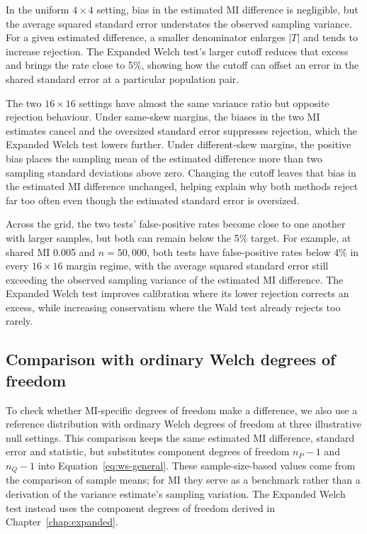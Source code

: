 \begin{table}[H]
\centering
\caption{Estimation errors and false-positive rates at three illustrative null settings.}
\label{tab:balanced-null-diagnostics}
\thesistableformat

\end{table}

In the uniform \(4\times4\) setting, bias in the estimated MI difference
is negligible, but the average squared standard error understates the observed sampling
variance. For a given estimated difference, a smaller denominator enlarges
\(|T|\) and tends to increase rejection. The Expanded Welch test's larger cutoff reduces that excess and brings the rate close to 5\%, showing how the
cutoff can offset an error in the shared standard error at a
particular population pair.

The two \(16\times16\) settings have almost the same variance ratio
but opposite rejection behaviour. Under same-skew margins, the biases in
the two MI estimates cancel and the oversized standard error suppresses
rejection, which the Expanded Welch test lowers further. Under different-skew
margins, the positive bias places the sampling mean of the estimated
difference more than two sampling standard deviations above zero. Changing the cutoff
leaves that bias in the estimated MI difference unchanged, helping explain
why both methods reject far too often even though the estimated standard
error is oversized.

Across the grid, the two tests' false-positive rates become close to one
another with larger samples, but both can remain below the 5\% target.
For example, at
shared MI 0.005 and \(n=50{,}000\), both tests have false-positive rates below 4\% in
every \(16\times16\) margin regime, with the average squared standard
error still exceeding the observed sampling variance of the estimated MI
difference. The Expanded Welch test improves calibration where its lower rejection
corrects an excess, while increasing
conservatism where the Wald test already rejects too rarely.

\subsection{Comparison with ordinary Welch degrees of freedom}

To check whether MI-specific degrees of freedom make a difference, we also
use a reference distribution with ordinary Welch degrees of freedom at three
illustrative null settings.
This comparison keeps the same estimated MI difference, standard error and
statistic, but substitutes component degrees of freedom \(n_P-1\) and
\(n_Q-1\) into Equation~\eqref{eq:ws-general}. These sample-size-based
values come from the comparison of sample means; for MI they serve as a
benchmark rather than a derivation of the variance estimate's sampling
variation. The Expanded Welch test instead uses the component degrees of freedom
derived in Chapter~\ref{chap:expanded}.

